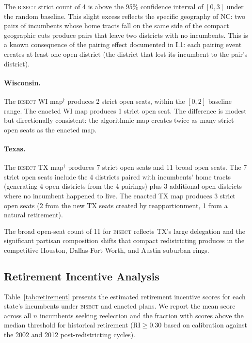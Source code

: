 The \textsc{bisect} strict count of 4 is above the 95\% confidence interval of $[0, 3]$
under the random baseline. This slight excess reflects the specific geography of NC:
two pairs of incumbents whose home tracts fall on the same side of the compact
geographic cuts produce pairs that leave two districts with no incumbents. This is
a known consequence of the pairing effect documented in I.1: each pairing event
creates at least one open district (the district that lost its incumbent to the pair's
district).

\paragraph{Wisconsin.}
The \textsc{bisect} WI map$^\dagger$ produces 2 strict open seats, within the $[0, 2]$
baseline range. The enacted WI map produces 1 strict open seat. The difference is modest
but directionally consistent: the algorithmic map creates twice as many strict open seats
as the enacted map.

\paragraph{Texas.}
The \textsc{bisect} TX map$^\dagger$ produces 7 strict open seats and 11 broad open
seats. The 7 strict open seats include the 4 districts paired with incumbents' home tracts
(generating 4 open districts from the 4 pairings) plus 3 additional open districts where
no incumbent happened to live. The enacted TX map produces 3 strict open seats (2 from the
new TX seats created by reapportionment, 1 from a natural retirement).

The broad open-seat count of 11 for \textsc{bisect} reflects TX's large delegation and
the significant partisan composition shifts that compact redistricting produces in the
competitive Houston, Dallas-Fort Worth, and Austin suburban rings.

\subsection{Retirement Incentive Analysis}

Table~\ref{tab:retirement} presents the estimated retirement incentive scores for each
state's incumbents under \textsc{bisect} and enacted plans. We report the mean score
across all $n$ incumbents seeking reelection and the fraction with scores above the
median threshold for historical retirement ($\text{RI} \geq 0.30$ based on calibration
against the 2002 and 2012 post-redistricting cycles).

